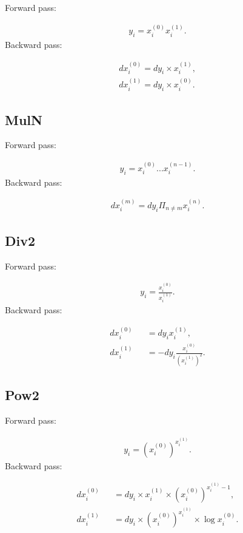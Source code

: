 \documentclass{article}
\begin{document}
Forward pass:

\begin{eqnarray}
  y_i = x^{(0)}_i x^{(1)}_i.
\end{eqnarray}
%
Backward pass:

\begin{eqnarray}
  dx^{(0)}_i = dy_i \times x^{(1)}_i, \\
  dx^{(1)}_i = dy_i \times x^{(0)}_i.  
\end{eqnarray}


\subsection{MulN}

Forward pass:

\begin{eqnarray}
  y_i = x^{(0)}_i . . . x^{(n-1)}_i.    
\end{eqnarray}
%
Backward pass:

\begin{eqnarray}
  dx^{(m)}_i = dy_i \Pi_{n \neq m} x^{(n)}_i.
\end{eqnarray}


\subsection{Div2}

Forward pass:

\begin{eqnarray}
  y_i = \frac{x^{(0)}_i} {x^{(1)}_i}.
\end{eqnarray}
%
Backward pass:

\begin{eqnarray}
  dx^{(0)}_i &&= dy_i x^{(1)}_i, \\
  dx^{(1)}_i &&= - dy_i \frac{x^{(0)}_i}{(x^{(1)}_i) ^2}.
\end{eqnarray}


\subsection{Pow2}

Forward pass:

\begin{eqnarray}
  y_i = {(x^{(0)}_i)} ^ {x^{(1)}_i}.
\end{eqnarray}
%
Backward pass:

\begin{eqnarray}
  dx^{(0)}_i &&= dy_i \times x^{(1)}_i \times {(x^{(0)}_i)} ^ {x^{(1)}_i -1}, \\
  dx^{(1)}_i &&= dy_i \times {(x^{(0)}_i)} ^ {x^{(1)}_i} \times  \log{x^{(0)}_i}.
\end{eqnarray}
\end{document}
